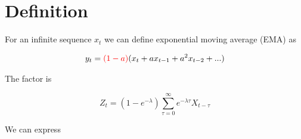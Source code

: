 \section{Definition}

For an infinite sequence $x_t$ we can define exponential moving average (EMA) as

\begin{align}
	y_t = \textcolor{red}{(1-a)} (x_t + a x_{t-1} + a^2 x_{t-2} + ...)
\end{align}

The factor  is

$$
Z_t = (1-e^{-\lambda}) \sum_{\tau=0}^{\infty} e^{-\lambda \tau} X_{t-\tau}
$$

We can express